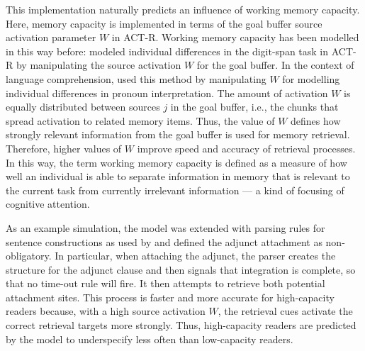 \documentclass{cambridge7A}\usepackage[]{graphicx}\usepackage[]{color}
\begin{document}
This implementation naturally predicts an influence of working memory capacity. Here, memory capacity is implemented in terms of the  goal buffer source activation parameter $W$ in ACT-R.
Working memory capacity has been modelled in this way before: \cite{DailyLovettReder2001} modeled individual differences in the digit-span task \citep{LovettRederLebiere1999} in ACT-R by manipulating the source activation $W$ for the goal buffer.  
In the context of language comprehension, \cite{VanRijVanRijnHendriks2013} used this method by manipulating $W$ for modelling individual differences in pronoun interpretation.
The amount of activation $W$ is equally distributed between sources $j$ in the goal buffer, i.e., the chunks that spread activation to related memory items. Thus, the value of $W$ defines how strongly relevant information from the goal buffer is used for memory retrieval. Therefore, higher values of $W$ improve speed and accuracy of retrieval processes. In this way, the term working memory capacity is defined as a measure of how well an individual is able to separate information in memory that is relevant to the current task from currently irrelevant information --- a kind of focusing of cognitive attention.

As an example simulation, the \cite{LewisVasishth2005} model was extended with parsing rules for sentence constructions as used by \cite{MalsburgVasishth2013} and defined the adjunct attachment as non-obligatory.
In particular, when attaching the adjunct, the parser creates the structure for the adjunct clause and then signals that integration is complete, so that no time-out rule will fire. It then attempts to retrieve both potential attachment sites. 
This process is faster and more accurate for high-capacity readers because, with a high source activation $W$, the retrieval cues  
activate the correct retrieval targets more strongly.
Thus, high-capacity readers are predicted by the model to underspecify less often than low-capacity readers.
\end{document}
